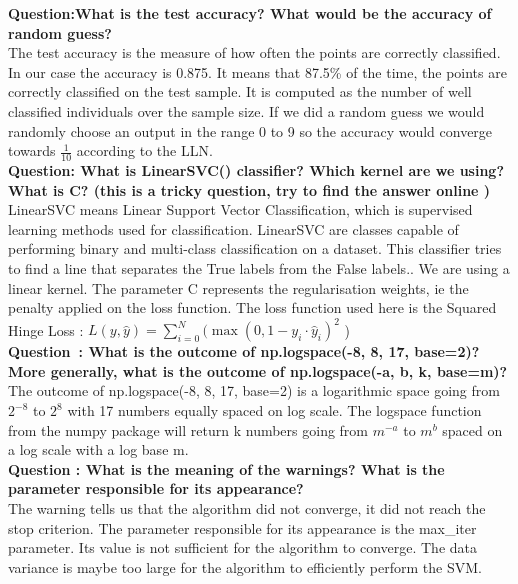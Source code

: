 \textbf{{Question}:What is the test accuracy? What would be the accuracy of random guess?} \\

The test accuracy is the measure of how often the points are correctly classified. In our case the accuracy is 0.875.  It means that 87.5\% of the time, the points are correctly classified on the test sample. It is computed as the number of well classified individuals over the sample size. If we did a random guess we would randomly choose an output in the range 0 to 9 so the accuracy would converge towards $\frac{1}{10}$ according to the LLN.  \\


\textbf{{Question}:  What is LinearSVC() classifier? Which kernel are we using? What is C? (this is a tricky question, try to find the answer online )}\\

LinearSVC means Linear Support Vector Classification, which is supervised learning methods used for classification. LinearSVC are classes capable of performing binary and multi-class classification on a dataset. 
This classifier tries to find a line that separates the True labels from the False labels.. We are using a linear kernel. The parameter C represents the regularisation weights, ie the penalty applied on the loss function. The loss function used here is the Squared Hinge Loss : $L(y, \hat y)=\sum^N_{i=0}(\max(0,1-y_i\cdot \hat y_i)^2$ )\\


\textbf{{Question} : What is the outcome of np.logspace(-8, 8, 17, base=2)? More generally, what is the outcome of np.logspace(-a, b, k, base=m)?}\\

The outcome of np.logspace(-8, 8, 17, base=2) is a logarithmic space going from $2^{-8}$ to $2^8$ with 17 numbers equally spaced on log scale.
 The logspace function from the numpy package will return k numbers going from $m^{-a}$ to $m^b$ spaced on a log scale with a log base m. \\

\textbf{Question : What is the meaning of the warnings? What is the parameter responsible for its appearance?}\\

The warning tells us that the algorithm did not converge, it did not reach the stop criterion. The parameter responsible for its appearance is the max\_iter parameter. Its value is not sufficient for the algorithm to converge. The data variance is maybe too large for the algorithm to efficiently perform the SVM. \\

